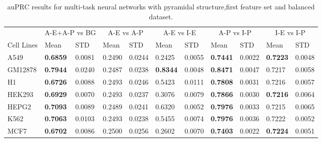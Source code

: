 \begin{table}[!htbp]
\centering
\caption{auPRC results for multi-task neural networks with pyramidal structure,first feature set and balanced dataset.}
\label{tab:pyramidal_auprc}
\hspace*{-2.2cm}
\begin{tabular}[t]{*{11}{l}}
\toprule
 & \multicolumn{2}{c}{A-E+A-P vs BG} & \multicolumn{2}{c}{A-E vs A-P} & \multicolumn{2}{c}{A-E vs I-E} & \multicolumn{2}{c}{A-P vs I-P} & \multicolumn{2}{c}{I-E vs I-P} \\
\cmidrule(lr){2-3}
\cmidrule(lr){4-5}
\cmidrule(lr){6-7}
\cmidrule(lr){8-9}
\cmidrule(lr){10-11}
Cell Lines & Mean & STD & Mean & STD & Mean & STD & Mean & STD & Mean & STD \\
\midrule
A549  & \textbf{0.6859} & 0.0081 & 0.2490 & 0.0244 & 0.2425 & 0.0055 & \textbf{0.7441} & 0.0022 & \textbf{0.7223} & 0.0048\\
GM12878 & \textbf{0.7944} & 0.0240 & 0.2487 & 0.0238 & \textbf{0.8344} & 0.0048 & \textbf{0.8471} & 0.0047 & 0.7217 & 0.0058\\
H1  & \textbf{0.6726} & 0.0088 & 0.2493 & 0.0246 & 0.5423 & 0.0111 & \textbf{0.7808} & 0.0031 & 0.7216 & 0.0057\\
HEK293  & \textbf{0.6929} & 0.0070 & 0.2493 & 0.0237 & 0.3076 & 0.0079 & \textbf{0.7866} & 0.0030 & \textbf{0.7216} & 0.0064\\
HEPG2  & \textbf{0.7093} & 0.0089 & 0.2489 & 0.0241 & 0.6320 & 0.0052 & \textbf{0.7976} & 0.0033 & 0.7215 & 0.0065\\
K562  & \textbf{0.7063} & 0.0103 & 0.2493 & 0.0238 & 0.5455 & 0.0074 & \textbf{0.7976} & 0.0036 & 0.7222 & 0.0052\\
MCF7  & \textbf{0.6702} & 0.0086 & 0.2500 & 0.0256 & 0.2602 & 0.0070 & \textbf{0.7403} & 0.0022 & \textbf{0.7224} & 0.0051\\
\bottomrule
\end{tabular}
\hspace*{-2.2cm}
\end{table}
%
%
